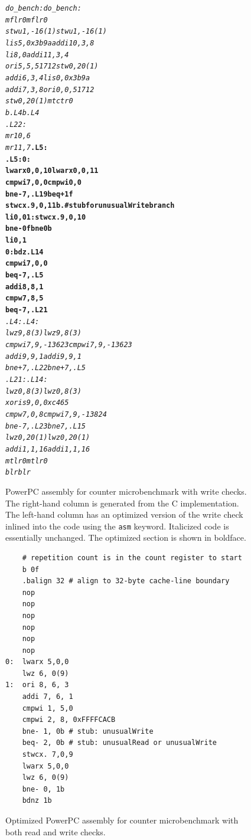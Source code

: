 \begin{figure}
\sis\fontsize{9}{10}\begin{alltt}
\textit{do_bench:              do_bench:
  mflr 0                 mflr 0
  stwu 1,-16(1)          stwu 1,-16(1)
  lis 5,0x3b9a           addi 10,3,8
  li 8,0                 addi 11,3,4
  ori 5,5,51712          stw 0,20(1)
  addi 6,3,4             lis 0,0x3b9a
  addi 7,3,8             ori 0,0,51712
  stw 0,20(1)            mtctr 0
  b .L4                  b .L4
.L22:
  mr 10,6
  mr 11,7              }\textbf{.L5:
.L5:                   0:
  lwarx 0,0,10           lwarx 0,0,11
  cmpwi 7,0,0            cmpwi 0,0
  bne- 7,.L19            beq+ 1f
  stwcx. 9,0,11          b . # stub for unusualWrite branch
  li 0,0               1:stwcx. 9,0,10
  bne- 0f                bne 0b
  li 0,1
0:                       bdz .L14
  cmpwi 7,0,0
  beq- 7,.L5
  addi 8,8,1
  cmpw 7,8,5
  beq- 7,.L21}\textit{
.L4:                   .L4:
  lwz 9,8(3)             lwz 9,8(3)
  cmpwi 7,9,-13623       cmpwi 7,9,-13623
  addi 9,9,1             addi 9,9,1
  bne+ 7,.L22            bne+ 7,.L5
.L21:                  .L14:
  lwz 0,8(3)             lwz 0,8(3)
                         xoris 9,0,0xc465
  cmpw 7,0,8             cmpwi 7,9,-13824
  bne- 7,.L23            bne 7,.L15
  lwz 0,20(1)            lwz 0,20(1)
  addi 1,1,16            addi 1,1,16
  mtlr 0                 mtlr 0             
  blr                    blr}
\end{alltt}
\caption[PowerPC assembly for counter microbenchmark with
  write checks.]{PowerPC assembly for counter microbenchmark with
  write checks.  The right-hand column is generated from the C
  implementation.  The left-hand column has an optimized version of the
  write check inlined into the code using the \texttt{asm} keyword.
  Italicized code is essentially unchanged.  The optimized section is
  shown in boldface.}
\label{fig:write-assem}
\end{figure}
\begin{figure}
\sis\fontsize{9}{10}\begin{verbatim}
    # repetition count is in the count register to start
    b 0f
    .balign 32 # align to 32-byte cache-line boundary
    nop
    nop
    nop
    nop
    nop
    nop
0:  lwarx 5,0,0
    lwz 6, 0(9)
1:  ori 8, 6, 3
    addi 7, 6, 1
    cmpwi 1, 5,0
    cmpwi 2, 8, 0xFFFFCACB
    bne- 1, 0b # stub: unusualWrite
    beq- 2, 0b # stub: unusualRead or unusualWrite
    stwcx. 7,0,9
    lwarx 5,0,0
    lwz 6, 0(9)
    bne- 0, 1b
    bdnz 1b
\end{verbatim}
\caption{Optimized PowerPC assembly for counter microbenchmark with both read
  and write checks.}
\label{fig:rw-assem}
\end{figure}
